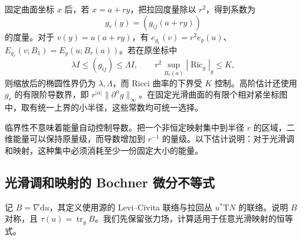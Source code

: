 \ProseParagraphBreak

固定曲面坐标 \(x\) 后，若 \(x=a+ry\)，把拉回度量除以 \(r^2\)，得到系数为
\[
	g_r(y)=(g_{ij}(a+ry))
\]
的度量。对于 \(v(y)=u(a+ry)\)，有
\(e_{g_r}(v)=r^2e_g(u)\)、\(E_{g_r}(v;B_1)=E_g(u;B_r(a))\)。若在原坐标中
\begin{equation}\label{g3:eq:surface-coordinate-controls}
	\lambda I\le(g_{ij})\le\Lambda I,
	\qquad r^2\sup_{B_r(a)}|\operatorname{Ric}_g|_g\le K,
\end{equation}
则缩放后的椭圆性界仍为 \(\lambda,\Lambda\)，而 Ricci 曲率的下界受 \(K\) 控制。高阶估计还使用 \(g_r\) 的有限阶导数界，即 \(r^{|\alpha|}\|\partial^\alpha g\|_\infty\)。在固定光滑曲面的有限个相对紧坐标图中，取有统一上界的小半径，这些常数均可统一选择。

\ProseParagraphBreak

临界性不意味着能量自动控制导数。把一个非恒定映射集中到半径 \(r\) 的区域，二维能量可以保持原量级，而导数增加到 \(r^{-1}\) 的量级。以下估计说明：对于光滑调和映射，这种集中必须消耗至少一份固定大小的能量。

\subsection{光滑调和映射的 Bochner 微分不等式}
\label{g3:subsec:1803:02}
记 \(B=\nabla\mathrm du\)，其定义使用源的 Levi--Civita 联络与拉回丛 \(u^*\mathrm TN\) 的联络。说明 \(B\) 对称，且 \(\tau(u)=\operatorname{tr}_gB\)。我们先保留张力场，计算适用于任意光滑映射的恒等式。

